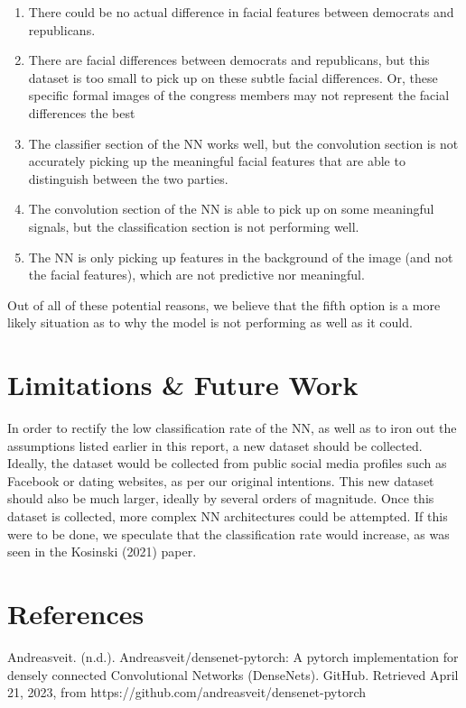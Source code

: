 \documentclass[manuscript,screen,review]{acmart}
\begin{document}
\begin{enumerate}
\item There could be no actual difference in facial features between democrats and republicans. 
\item There are facial differences between democrats and republicans, but this dataset is too small to pick up on these subtle facial differences. Or, these specific formal images of the congress members may not represent the facial differences the best
\item The classifier section of the NN works well, but the convolution section is not accurately picking up the meaningful facial features that are able to distinguish between the two parties. 
\item The convolution section of the NN is able to pick up on some meaningful signals, but the classification section is not performing well. 
\item The NN is only picking up features in the background of the image (and not the facial features), which are not predictive nor meaningful. 
\end{enumerate}

Out of all of these potential reasons, we believe that the fifth option is a more likely situation as to why the model is not performing as well as it could.


\section{Limitations \& Future Work}

In order to rectify the low classification rate of the NN, as well as to iron out the assumptions listed earlier in this report, a new dataset should be collected. Ideally, the dataset would be collected from public social media profiles such as Facebook or dating websites, as per our original intentions. This new dataset should also be much larger, ideally by several orders of magnitude. Once this dataset is collected, more complex NN architectures could be attempted. If this were to be done, we speculate that the classification rate would increase, as was seen in the Kosinski (2021) paper.


\section{References}

Andreasveit. (n.d.). Andreasveit/densenet-pytorch: A pytorch implementation for densely connected Convolutional Networks (DenseNets). GitHub. Retrieved April 21, 2023, from https://github.com/andreasveit/densenet-pytorch 
\end{document}
